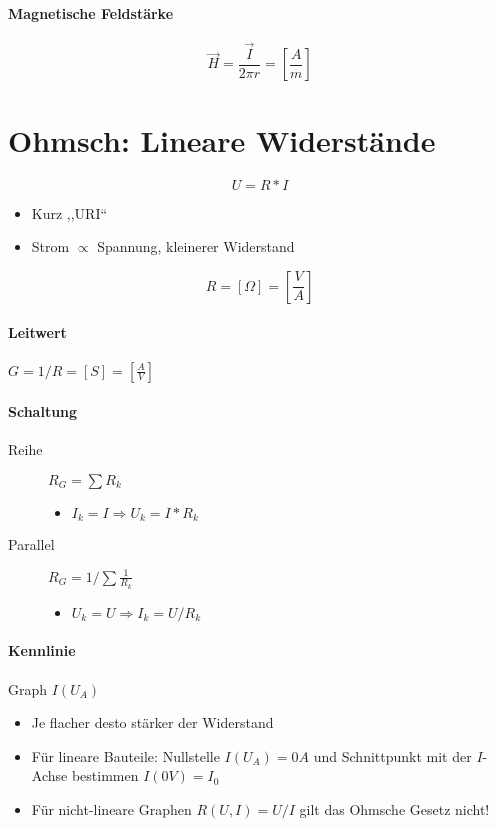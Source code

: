 \paragraph{Magnetische Feldstärke}

$$\vec{H} = \frac{\vec{I}}{2\pi r} = \left[\frac{A}{m}\right]$$

\section{Ohmsch: Lineare Widerstände}

$$U = R * I$$

\begin{itemize}
  \item Kurz ,,URI``
  \item Strom $\propto$ Spannung, kleinerer Widerstand
\end{itemize}

$$R = [\Omega] = \left[\frac{V}{A}\right]$$

\paragraph{Leitwert} $G = 1/R = [S] = \left[\frac{A}{V}\right]$

\paragraph{Schaltung}

\begin{description}
  \item[Reihe] $R_G = \sum R_k$
    \begin{itemize}
      \item $I_k = I \Rightarrow U_k = I * R_k$
    \end{itemize}

  \item[Parallel] $R_G = 1 / \sum \frac{1}{R_k}$
    \begin{itemize}
      \item $U_k = U \Rightarrow I_k = U/R_k$
    \end{itemize}
\end{description}

\paragraph{Kennlinie} Graph $I(U_A)$

\begin{itemize}
  \item Je flacher desto stärker der Widerstand
  \item Für lineare Bauteile: Nullstelle $I(U_A) = 0A$ und Schnittpunkt mit der $I$-Achse bestimmen $I(0V) = I_0$
  \item Für nicht-lineare Graphen $R(U, I) = U/I$ gilt das Ohmsche Gesetz nicht!
\end{itemize}

